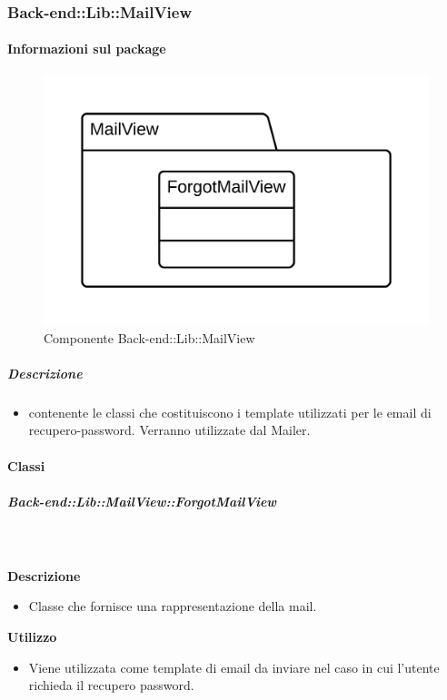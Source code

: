   \subsubsection{Back-end::Lib::MailView}
  \paragraph{Informazioni sul package} 
    \begin{figure}[H] 
      \begin{center} 
        \includegraphics[width=\textwidth]{packages/Back-end::Lib::MailView.png}  
        \caption{Componente Back-end::Lib::MailView}
      \end{center}  
    \end{figure} 
  \subparagraph{Descrizione} 
    \begin{itemize}
    \item[]  contenente le classi che costituiscono i template utilizzati per le email di recupero-password. Verranno utilizzate dal  Mailer.
    \end{itemize} 
    \paragraph{Classi}
      \subparagraph{Back-end::Lib::MailView::ForgotMailView}
        
        \textbf{\\ \\ Descrizione} 
          \begin{itemize}
            \item[] Classe che fornisce una rappresentazione della mail.
          \end{itemize}      
        \textbf{Utilizzo}  
          \begin{itemize}
            \item[] Viene utilizzata come template di email da inviare nel caso in cui l'utente richieda il recupero password.
          \end{itemize}
